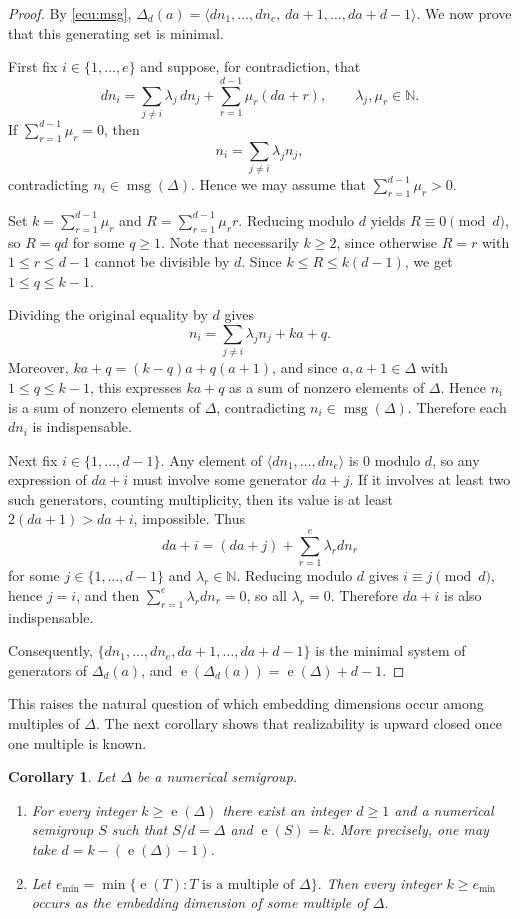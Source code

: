 \documentclass[12pt,a4paper]{amsart}
\newtheorem{corollary}[theorem]{Corollary}
\theoremstyle{definition}
\theoremstyle{remark}
\begin{document}
\begin{proof}
By \eqref{ecu:msg}, $\Delta_d(a)=\langle dn_1,\dots,dn_e,\,da+1,\dots,da+d-1\rangle$.
We now prove that this generating set is minimal.

First fix $i\in\{1,\dots,e\}$ and suppose, for contradiction, that
\[
dn_i=\sum_{j\neq i}\lambda_j\,dn_j+\sum_{r=1}^{d-1}\mu_r(da+r),
\qquad \lambda_j,\mu_r\in\mathbb{N}.
\]
If $\sum_{r=1}^{d-1}\mu_r=0$, then
\[
n_i=\sum_{j\neq i}\lambda_j n_j,
\]
contradicting $n_i\in\operatorname{msg}(\Delta)$. Hence we may assume that
$\sum_{r=1}^{d-1}\mu_r>0$.

Set $k=\sum_{r=1}^{d-1}\mu_r$ and $R=\sum_{r=1}^{d-1}\mu_r r$.
Reducing modulo $d$ yields $R\equiv 0\pmod d$, so $R=qd$ for some $q\ge 1$.
Note that necessarily $k\ge 2$, since otherwise $R=r$ with $1\le r\le d-1$ cannot
be divisible by $d$. Since $k\le R\le k(d-1)$, we get $1\le q\le k-1$.

Dividing the original equality by $d$ gives
\[
n_i=\sum_{j\neq i}\lambda_j n_j+ka+q.
\]
Moreover, $ka+q=(k-q)a+q(a+1)$, and since $a,a+1\in \Delta$ with
$1\le q\le k-1$, this expresses $ka+q$ as a sum of nonzero elements of $\Delta$.
Hence $n_i$ is a sum of nonzero elements of $\Delta$, contradicting
$n_i\in\operatorname{msg}(\Delta)$. Therefore each $dn_i$ is indispensable.

Next fix $i\in\{1,\dots,d-1\}$. Any element of $\langle dn_1,\dots,dn_e\rangle$
is $0$ modulo $d$, so any expression of $da+i$ must involve some generator $da+j$.
If it involves at least two such generators, counting multiplicity, then its value is at
least $2(da+1)>da+i$, impossible. Thus
\[
da+i=(da+j)+\sum_{r=1}^e\lambda_r dn_r
\]
for some $j\in\{1,\dots,d-1\}$ and $\lambda_r\in\mathbb{N}$. Reducing modulo $d$
gives $i\equiv j\pmod d$, hence $j=i$, and then
$\sum_{r=1}^e\lambda_rdn_r=0$, so all $\lambda_r=0$. Therefore $da+i$ is also
indispensable.

Consequently, $\{dn_1,\dots,dn_e,da+1,\dots,da+d-1\}$ is the minimal system of
generators of $\Delta_d(a)$, and $\operatorname{e}(\Delta_d(a))=\operatorname{e}(\Delta)+d-1$.
\end{proof}

This raises the natural question of which embedding dimensions occur among multiples of $\Delta$.
The next corollary shows that realizability is upward closed once one multiple is known.

\begin{corollary}\label{cor:embdim-both}
Let $\Delta$ be a numerical semigroup.
\begin{enumerate}
\item For every integer $k\ge \operatorname{e}(\Delta)$ there exist an integer $d\ge 1$ and a numerical
semigroup $S$ such that $S/d=\Delta$ and $\operatorname{e}(S)=k$. More precisely, one may take
$d=k-(\operatorname{e}(\Delta)-1)$.
\item Let
$
e_{\min}=\min\{\operatorname{e}(T): T \text{ is a multiple of } \Delta\}.
$
Then every integer $k\ge e_{\min}$ occurs as the embedding dimension of some multiple of
$\Delta$.
\end{enumerate}
\end{corollary}
\end{document}
